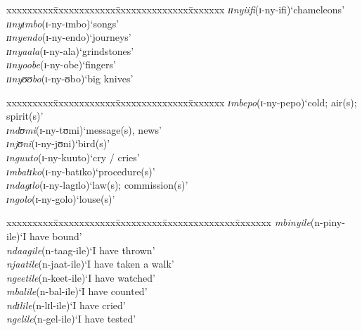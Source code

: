 \begin{exe}
	\ex \label{exnyclasses910}
	\begin{tabbing}
		xxxxxxxxx\=xxxxxxxxxxxx\=xxxxxxxxxxxxxx\=xxxxxxx\kill 
		\textit{ɪɪnyiifi}\>(\degree ɪ-ny-ifi)\>`chameleons'
		\\\textit{ɪɪnyɪmbo}\>(\degree ɪ-ny-ɪmbo)\>`songs'
		\\\textit{ɪɪnyendo}\>(\degree ɪ-ny-endo)\>`journeys'
		\\\textit{ɪɪnyaala}\>(\degree ɪ-ny-ala)\>`grindstones'
		\\\textit{ɪɪnyoobe}\>(\degree ɪ-ny-obe)\>`fingers'
		\\\textit{ɪɪnyʊʊbo}\>(\degree ɪ-ny-ʊbo)\>`big knives'
	\end{tabbing}
	              \newpage 
	\ex \label{exNCclasses910}
	\begin{tabbing}
		xxxxxxxxx\=xxxxxxxxxxxx\=xxxxxxxxxxxxxx\=xxxxxxx\kill 
		\textit{ɪmbepo}\>(\degree ɪ-ny-pepo)\>`cold; air(s); spirit(s)'
		\\\textit{ɪndʊmi}\>(\degree ɪ-ny-tʊmi)\>`message(s), news'
		\\\textit{ɪnjʊni}\>(\degree ɪ-ny-jʊni)\>`bird(s)'
		\\\textit{ɪnguuto}\>(\degree ɪ-ny-kuuto)\>`cry / cries'
		\\\textit{ɪmbatɪko}\>(\degree ɪ-ny-batɪko)\>`procedure(s)'
		\\\textit{ɪndagɪlo}\>(\degree ɪ-ny-lagɪlo)\>`law(s); commission(s)'
		\\\textit{ɪngolo}\>(\degree ɪ-ny-golo)\>`louse(s)'
	\end{tabbing}
	\ex\label{exNC1sg}
	\begin{tabbing}
		xxxxxxxxx\=xxxxxxxxxxxx\=xxxxxxxxx\=xxxxxxxxxxxxxx\=xxxxxxx\kill 
		\textit{mbinyile}\>(\degree n-piny-ile)\>`I have bound' 
		\\\textit{ndaagile}\>(\degree n-taag-ile)\>`I have thrown'
		\\\textit{njaatile}\>(\degree n-jaat-ile)\>`I have taken a walk' 
		\\\textit{ngeetile}\>(\degree n-keet-ile)\>`I have watched'
		\\\textit{mbalile}\>(\degree n-bal-ile)\>`I have counted'
		\\\textit{ndɪlile}\>(\degree n-lɪl-ile)\>`I have cried'
		\\\textit{ngelile}\>(\degree n-gel-ile)\>`I have tested'
	\end{tabbing}
\end{exe}

